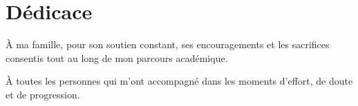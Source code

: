 \chapter*{Dédicace}

À ma famille, pour son soutien constant, ses encouragements et les sacrifices consentis tout au long de mon parcours académique.

À toutes les personnes qui m'ont accompagné dans les moments d'effort, de doute et de progression.


